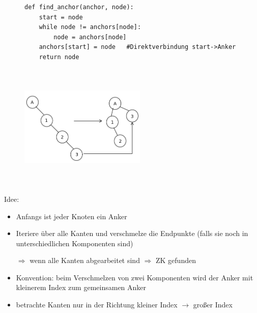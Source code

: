             \begin{figure}[htbp]
                \begin{minipage}[t]{11cm}
                    \vspace{0cm}
                    \begin{verbatim}
def find_anchor(anchor, node):
    start = node
    while node != anchors[node]:
        node = anchors[node]
    anchors[start] = node   #Direktverbindung start->Anker
    return node
                    \end{verbatim}
                \end{minipage}
                \begin{minipage}[t]{6cm}
                    \vspace{0.0cm}
                    \includegraphics[width=6cm,height=6cm,keepaspectratio]{./Pictures/Stern.png}
                \end{minipage}
            \end{figure}


            Idee:
            \begin{itemize}
                \item Anfangs ist jeder Knoten ein Anker
                \item Iteriere über alle Kanten und verschmelze die Endpunkte (falls sie noch in unterschiedlichen Komponenten sind)
                \item[$\Rightarrow$] wenn alle Kanten abgearbeitet sind $\Rightarrow$ ZK gefunden
                \item Konvention: beim Verschmelzen von zwei Komponenten wird der Anker mit kleinerem Index zum gemeinsamen Anker
                \item betrachte Kanten nur in der Richtung kleiner Index $\rightarrow$ großer Index
            \end{itemize}

